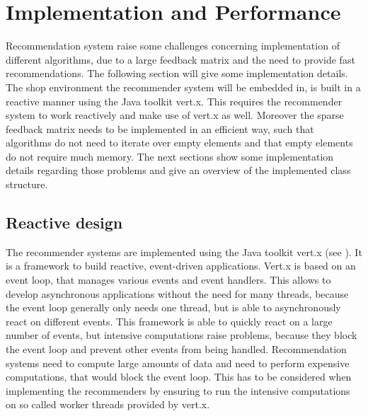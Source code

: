 \documentclass[10pt]{reportMaster}
\begin{document}
\chapter{Implementation and Performance}
\label{chap:ImplemenationAndPerformance}
Recommendation system raise some challenges concerning implementation of different algorithms, due to a large feedback matrix and the need to provide fast recommendations.
The following section will give some implementation details. 
The shop environment the recommender system will be embedded in, is built in a reactive manner using the Java toolkit vert.x.
This requires the recommender system to work reactively and make use of vert.x as well.
Moreover the sparse feedback matrix needs to be implemented in an efficient way, such that algorithms do not need to iterate over empty elements and that empty elements do not require much memory.
The next sections show some implementation details regarding those problems and give an overview of the implemented class structure.

\section{Reactive design}
\label{sec:ReactiveDesign}
The recommender systems are implemented using the Java toolkit vert.x (see \cite{vertx}).
It is a framework to build reactive, event-driven applications.
Vert.x is based on an event loop, that manages various events and event handlers.
This allows to develop asynchronous applications without the need for many threads, because the event loop generally only needs one thread, but is able to asynchronously react on different events.
This framework is able to quickly react on a large number of events, but intensive computations raise problems, because they block the event loop and prevent other events from being handled.
Recommendation systems need to compute large amounts of data and need to perform expensive computations, that would block the event loop.
This has to be considered when implementing the recommenders by ensuring to run the intensive computations on so called worker threads provided by vert.x.
\end{document}
